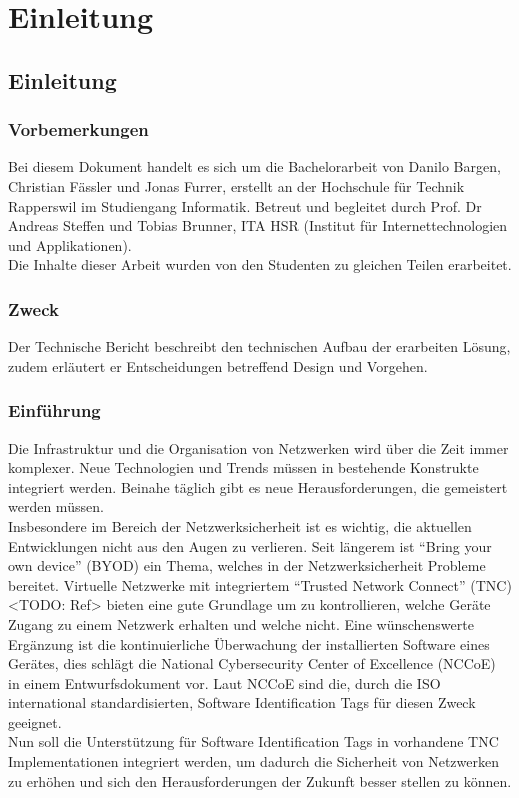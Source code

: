 \chapter{Einleitung}
\section{Einleitung}

\subsection{Vorbemerkungen}
Bei diesem Dokument handelt es sich um die Bachelorarbeit von Danilo Bargen,
Christian Fässler und Jonas Furrer, erstellt an der Hochschule für Technik Rapperswil 
im Studiengang Informatik. Betreut und begleitet durch Prof. Dr
Andreas Steffen und Tobias Brunner, ITA HSR (Institut für Internettechnologien
und Applikationen).\\
Die Inhalte dieser Arbeit wurden von den Studenten zu gleichen Teilen
erarbeitet.

\subsection{Zweck}
Der Technische Bericht beschreibt den technischen Aufbau der erarbeiten Lösung,
zudem erläutert er Entscheidungen betreffend Design und Vorgehen.

\subsection{Einführung}
Die Infrastruktur und die Organisation von Netzwerken wird über die Zeit immer
komplexer. Neue Technologien und Trends müssen in bestehende Konstrukte
integriert werden. Beinahe täglich gibt es neue Herausforderungen, die
gemeistert werden müssen.\\
Insbesondere im Bereich der Netzwerksicherheit ist es wichtig, die aktuellen
Entwicklungen nicht aus den Augen zu verlieren. Seit längerem ist \enquote{Bring
your own device} (BYOD) ein Thema, welches in der Netzwerksicherheit Probleme
bereitet. Virtuelle Netzwerke mit integriertem \enquote{Trusted Network Connect}
(TNC) <TODO: Ref> bieten eine gute Grundlage um zu kontrollieren, welche Geräte
Zugang zu einem Netzwerk erhalten und welche nicht. Eine wünschenswerte
Ergänzung ist die kontinuierliche Überwachung der installierten Software eines
Gerätes, dies schlägt die National Cybersecurity Center of Excellence (NCCoE) in
einem Entwurfsdokument vor. Laut NCCoE sind die, durch die ISO international
standardisierten, Software Identification Tags für diesen Zweck geeignet.\\
Nun soll die Unterstützung für Software Identification Tags in vorhandene TNC
Implementationen integriert werden, um dadurch die Sicherheit von Netzwerken zu
erhöhen und sich den Herausforderungen der Zukunft besser stellen zu können.